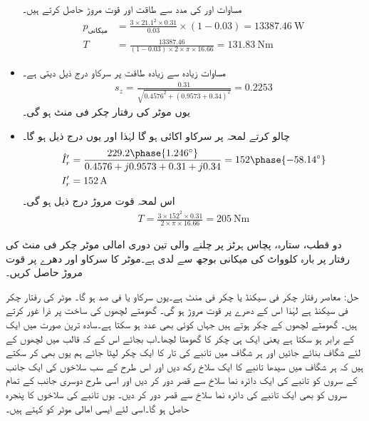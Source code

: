 \begin{itemize}
مساوات   اور   کی مدد سے طاقت اور قوت مروڑ حاصل کرتے ہیں۔
\begin{align*}
p_{\text{میکانی}}&=\frac{3\times 21.1^2\times 0.31}{0.03} \times (1-0.03)=\SI{13387.46}{\watt}\\
T&=\frac{13387.46}{(1-0.03) \times 2\times \pi \times 16.66}=\SI{131.83}{\newton \meter}
\end{align*}
%
\item
مساوات  زیادہ سے زیادہ طاقت پر سرکاو درج ذیل دیتی ہے۔
\begin{align*}
s_z=\frac{0.31}{\sqrt{0.4576^2+(0.9573+0.34)^2}}=0.2253
\end{align*}
یوں موٹر کی رفتار  چکر فی منٹ  ہو گی۔
\item
چالو کرتے لمحہ پر سرکاو اکائی ہو گا لہٰذا  اور یوں درج ذیل ہو گا۔
\begin{align*}
\hat{I}_r'&=\frac{229.2 \phase{1.246^{\circ}}}{0.4576+j 0.9573+0.31+j 0.34}=152\phase{-58.14^{\circ}}\\
I_r'&=\SI{152}{\ampere}
\end{align*}
اس لمحہ قوت مروڑ درج ذیل ہو گی۔
\begin{align*}
T=\frac{3 \times 152^2 \times 0.31}{2 \times \pi \times 16.66}=\SI{205}{\newton \meter}
\end{align*}
\end{itemize}
%
دو قطب، ستارہ،  پچاس ہرٹز پر چلنے والی تین دوری امالی موٹر   چکر فی منٹ کی رفتار پر بارہ کلوواٹ کی میکانی بوجھ سے لدی ہے۔موٹر کا سرکاو اور دھرے پر قوت مروڑ  حاصل کریں۔

حل:\quad
معاصر رفتار  چکر فی سیکنڈ یا  چکر فی منٹ ہے۔یوں سرکاو   یا  فی صد ہو گا۔ موٹر کی رفتار   چکر فی سیکنڈ ہے لہٰذا اس کے  دھرے پر قوت مروڑ   ہو گی۔
%
گھومتے لچھوں کی ساخت پر ذرا غور کرتے ہیں۔ گھومتے لچھوں کے   چکر ہوتے ہیں جہاں  کوئی بھی عدد ہو سکتا ہے۔سادہ ترین صورت میں   ایک کے برابر ہو سکتا ہے یعنی ایک ہی چکر کا گھومتا لچھا۔اب بجائے اس کے کہ قالب میں لچھوں کے لئے شگاف بنائے جائیں اور ہر شگاف میں تانبے کی تار کا ایک چکر لپٹا جائے ہم یوں بھی کر سکتے ہیں کہ ہر شگاف میں سیدھا تانبے کا ایک سلاخ رکھ دیں اور اس طرح کے سب سلاخوں کی ایک جانب کے سروں کو تانبے کی ایک دائرہ نما سلاخ سے قصر دور کر دیں اور اسی طرح دوسری جانب کے تمام سروں کو بھی ایک تانبے کی دائرہ نما سلاخ سے قصر  دور کر دیں۔ یوں تانبے کی سلاخوں کا پنجرہ حاصل ہو گا۔اسی لئے ایسی امالی موٹر کو  کہتے ہیں۔

